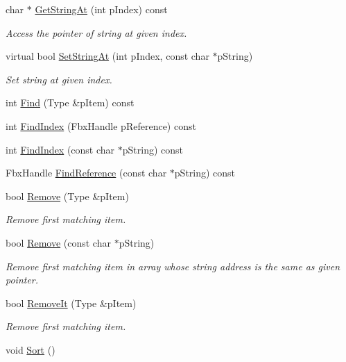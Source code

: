 \begin{Indent}
\begin{DoxyCompactItemize}
char $\ast$ \hyperlink{class_fbx_string_list_t_a9027620858ce83b4232cca2815b71047}{Get\+String\+At} (int p\+Index) const
\begin{DoxyCompactList}\small\item\em Access the pointer of string at given index. \end{DoxyCompactList}\item 
virtual bool \hyperlink{class_fbx_string_list_t_a4b757a856d12717cfcf854e767af54f1}{Set\+String\+At} (int p\+Index, const char $\ast$p\+String)
\begin{DoxyCompactList}\small\item\em Set string at given index. \end{DoxyCompactList}\item 
int \hyperlink{class_fbx_string_list_t_a537eb6d3e7568488280c9cf6fd37899f}{Find} (Type \&p\+Item) const
\item 
int \hyperlink{class_fbx_string_list_t_a96be804ab1570fc90a651cf6e40cda1f}{Find\+Index} (Fbx\+Handle p\+Reference) const
\item 
int \hyperlink{class_fbx_string_list_t_a50609bf493c67a131c531409cbfe8f8b}{Find\+Index} (const char $\ast$p\+String) const
\item 
Fbx\+Handle \hyperlink{class_fbx_string_list_t_acb79b34d154663f6f7478bfa823641b4}{Find\+Reference} (const char $\ast$p\+String) const
\item 
bool \hyperlink{class_fbx_string_list_t_aa9085a3f134422ecebbd406d0ce2025d}{Remove} (Type \&p\+Item)
\begin{DoxyCompactList}\small\item\em Remove first matching item. \end{DoxyCompactList}\item 
bool \hyperlink{class_fbx_string_list_t_ad8581d1b4206633b7c0ccfebe8bb3bdf}{Remove} (const char $\ast$p\+String)
\begin{DoxyCompactList}\small\item\em Remove first matching item in array whose string address is the same as given pointer. \end{DoxyCompactList}\item 
bool \hyperlink{class_fbx_string_list_t_a810bce1e1440e69c6e44a657cfe5d2a3}{Remove\+It} (Type \&p\+Item)
\begin{DoxyCompactList}\small\item\em Remove first matching item. \end{DoxyCompactList}\item 
void \hyperlink{class_fbx_string_list_t_a2fc06dea6d617b78af117cc4b8d97e3b}{Sort} ()

\end{DoxyCompactItemize}
\end{Indent}
